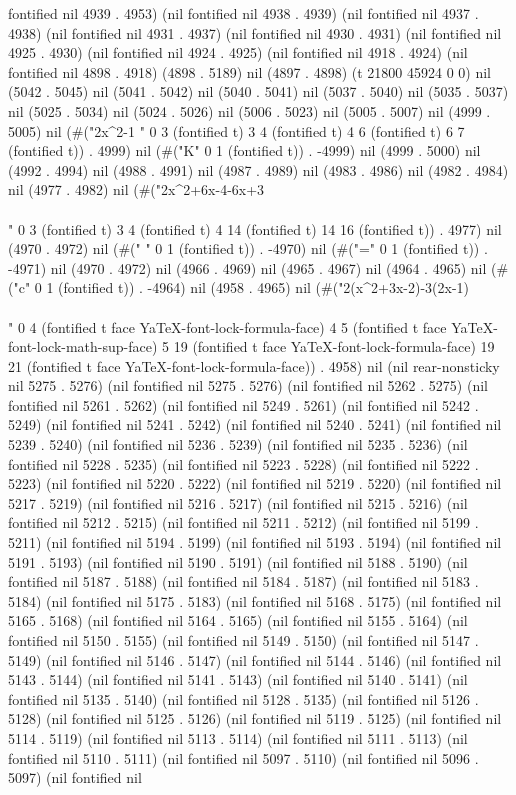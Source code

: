 fontified nil 4939 . 4953) (nil fontified nil 4938 . 4939) (nil fontified nil 4937 . 4938) (nil fontified nil 4931 . 4937) (nil fontified nil 4930 . 4931) (nil fontified nil 4925 . 4930) (nil fontified nil 4924 . 4925) (nil fontified nil 4918 . 4924) (nil fontified nil 4898 . 4918) (4898 . 5189) nil (4897 . 4898) (t 21800 45924 0 0) nil (5042 . 5045) nil (5041 . 5042) nil (5040 . 5041) nil (5037 . 5040) nil (5035 . 5037) nil (5025 . 5034) nil (5024 . 5026) nil (5006 . 5023) nil (5005 . 5007) nil (4999 . 5005) nil (#("2x^2-1 " 0 3 (fontified t) 3 4 (fontified t) 4 6 (fontified t) 6 7 (fontified t)) . 4999) nil (#("K" 0 1 (fontified t)) . -4999) nil (4999 . 5000) nil (4992 . 4994) nil (4988 . 4991) nil (4987 . 4989) nil (4983 . 4986) nil (4982 . 4984) nil (4977 . 4982) nil (#("2x^2+6x-4-6x+3\\\\" 0 3 (fontified t) 3 4 (fontified t) 4 14 (fontified t) 14 16 (fontified t)) . 4977) nil (4970 . 4972) nil (#(" " 0 1 (fontified t)) . -4970) nil (#("=" 0 1 (fontified t)) . -4971) nil (4970 . 4972) nil (4966 . 4969) nil (4965 . 4967) nil (4964 . 4965) nil (#("c" 0 1 (fontified t)) . -4964) nil (4958 . 4965) nil (#("2(x^2+3x-2)-3(2x-1)\\\\" 0 4 (fontified t face YaTeX-font-lock-formula-face) 4 5 (fontified t face YaTeX-font-lock-math-sup-face) 5 19 (fontified t face YaTeX-font-lock-formula-face) 19 21 (fontified t face YaTeX-font-lock-formula-face)) . 4958) nil (nil rear-nonsticky nil 5275 . 5276) (nil fontified nil 5275 . 5276) (nil fontified nil 5262 . 5275) (nil fontified nil 5261 . 5262) (nil fontified nil 5249 . 5261) (nil fontified nil 5242 . 5249) (nil fontified nil 5241 . 5242) (nil fontified nil 5240 . 5241) (nil fontified nil 5239 . 5240) (nil fontified nil 5236 . 5239) (nil fontified nil 5235 . 5236) (nil fontified nil 5228 . 5235) (nil fontified nil 5223 . 5228) (nil fontified nil 5222 . 5223) (nil fontified nil 5220 . 5222) (nil fontified nil 5219 . 5220) (nil fontified nil 5217 . 5219) (nil fontified nil 5216 . 5217) (nil fontified nil 5215 . 5216) (nil fontified nil 5212 . 5215) (nil fontified nil 5211 . 5212) (nil fontified nil 5199 . 5211) (nil fontified nil 5194 . 5199) (nil fontified nil 5193 . 5194) (nil fontified nil 5191 . 5193) (nil fontified nil 5190 . 5191) (nil fontified nil 5188 . 5190) (nil fontified nil 5187 . 5188) (nil fontified nil 5184 . 5187) (nil fontified nil 5183 . 5184) (nil fontified nil 5175 . 5183) (nil fontified nil 5168 . 5175) (nil fontified nil 5165 . 5168) (nil fontified nil 5164 . 5165) (nil fontified nil 5155 . 5164) (nil fontified nil 5150 . 5155) (nil fontified nil 5149 . 5150) (nil fontified nil 5147 . 5149) (nil fontified nil 5146 . 5147) (nil fontified nil 5144 . 5146) (nil fontified nil 5143 . 5144) (nil fontified nil 5141 . 5143) (nil fontified nil 5140 . 5141) (nil fontified nil 5135 . 5140) (nil fontified nil 5128 . 5135) (nil fontified nil 5126 . 5128) (nil fontified nil 5125 . 5126) (nil fontified nil 5119 . 5125) (nil fontified nil 5114 . 5119) (nil fontified nil 5113 . 5114) (nil fontified nil 5111 . 5113) (nil fontified nil 5110 . 5111) (nil fontified nil 5097 . 5110) (nil fontified nil 5096 . 5097) (nil fontified nil 